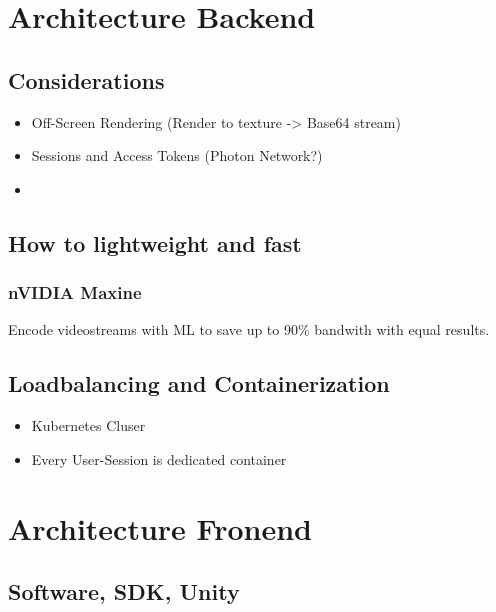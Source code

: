 \documentclass[titlepage, a4paper, 11pt]{scrartcl}
\begin{document}
    \section{Architecture Backend}

        \subsection{Considerations}

            \begin{itemize}
                \item Off-Screen Rendering (Render to texture -> Base64 stream)
                \item Sessions and Access Tokens (Photon Network?)
                \item 
            \end{itemize}

        \subsection{How to lightweight and fast}
		
			\subsubsection{nVIDIA Maxine}
				
				Encode videostreams with ML to save up to 90\% bandwith with equal results.

        \subsection{Loadbalancing and Containerization}

            \begin{itemize}
                \item Kubernetes Cluser
                \item Every User-Session is dedicated container
            \end{itemize}

    \section{Architecture Fronend}

        \subsection{Software, SDK, Unity}
\end{document}
